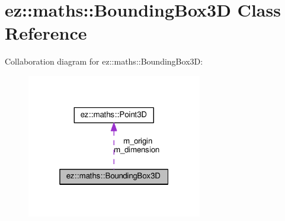\hypertarget{classez_1_1maths_1_1BoundingBox3D}{}\section{ez\+:\+:maths\+:\+:Bounding\+Box3D Class Reference}
\label{classez_1_1maths_1_1BoundingBox3D}


Collaboration diagram for ez\+:\+:maths\+:\+:Bounding\+Box3D\+:
\nopagebreak
\begin{figure}[H]
\begin{center}
\leavevmode
\includegraphics[width=217pt]{classez_1_1maths_1_1BoundingBox3D__coll__graph}
\end{center}
\end{figure}
